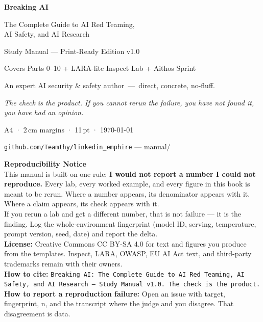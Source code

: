 
\begin{titlepage}
\begin{center}
\vspace*{1.5cm}
{\LARGE\bfseries Breaking AI\par}
\vspace{0.6cm}
{\Large The Complete Guide to AI Red Teaming,\\ AI Safety, and AI Research\par}
\vspace{2cm}
{\large Study Manual — Print-Ready Edition v1.0\par}
\vspace{0.4cm}
{\normalsize Covers Parts 0–10 + LARA-lite Inspect Lab + Aithos Sprint\par}
\vspace{3cm}
{\small An expert AI security \& safety author\ —\ direct, concrete, no-fluff.\par}
\vspace{1cm}
{\small\itshape The check is the product. If you cannot rerun the failure, you have not found it, you have had an opinion.\par}
\vfill
{\footnotesize A4 · 2\,cm margins · 11\,pt · \today\par}
{\footnotesize \texttt{github.com/Teamthy/linkedin\_emphire} — manual/\par}
\end{center}
\end{titlepage}

\thispagestyle{plain}
\noindent\textbf{Reproducibility Notice}\\[4pt]
{\small
This manual is built on one rule: \textbf{I would not report a number I could not reproduce.}
Every lab, every worked example, and every figure in this book is meant to be rerun. Where a number appears, its denominator appears with it. Where a claim appears, its check appears with it.\\
If you rerun a lab and get a different number, that is not failure — it is the finding. Log the whole-environment fingerprint (model ID, serving, temperature, prompt version, seed, date) and report the delta.\\
\textbf{License:} Creative Commons CC BY-SA 4.0 for text and figures you produce from the templates. Inspect, LARA, OWASP, EU AI Act text, and third-party trademarks remain with their owners.\\
\textbf{How to cite:} \texttt{Breaking AI: The Complete Guide to AI Red Teaming, AI Safety, and AI Research — Study Manual v1.0. The check is the product.}\\
\textbf{How to report a reproduction failure:} Open an issue with target, fingerprint, n, and the transcript where the judge and you disagree. That disagreement is data.
}
\vspace{1cm}
\\[8pt]

